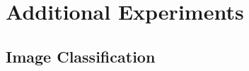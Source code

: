 \documentclass{article} \usepackage{iclr2022_conference,times}
\begin{document}
\section{Additional Experiments}
\label{sec:appx-experiments}
\begin{table}
\centering
\caption{Average PSNR for fitting of images in the Kodak dataset. Both our improved initialization scheme, as well as the inclusion of anisotropic Gabor functions lead to better reconstructions.}
\label{tab:kodak-results}
\begin{center}
\end{center}
\vspace{-2mm}
\end{table}




\subsection{Image Classification}
\end{document}
